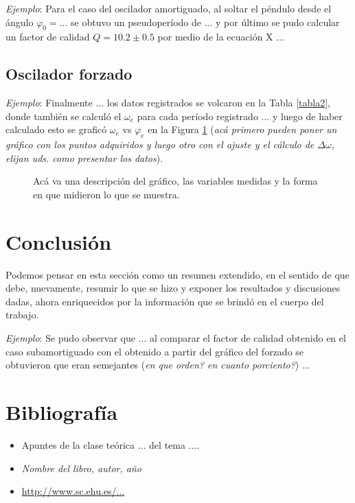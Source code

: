 \documentclass[12pt,a4paper]{article}
\begin{document}
\textit{Ejemplo}: Para el caso del oscilador amortiguado, al soltar el péndulo desde el ángulo $\varphi_0=...$ se obtuvo un pseudoperíodo de ... y por último se pudo calcular un factor de calidad $Q=10.2 \pm 0.5$ por medio de la ecuación X ...

\subsection{Oscilador forzado}

\textit{Ejemplo}: Finalmente ... los datos registrados se volcaron en la Tabla \ref{tabla2}, donde también se calculó el $\omega_e$ para cada período registrado ... y luego de haber calculado esto se graficó $\omega_e$ vs $\varphi_e$ en la Figura \ref{fig2} (\textit{acá primero pueden poner un gráfico con los puntos adquiridos y luego otro con el ajuste y el cálculo de $\Delta \omega$, elijan uds. como presentar los datos}). 




\begin{figure}[ht]
    \centering
    \caption{Acá va una descripción del gráfico, las variables medidas y la forma en que midieron lo que se muestra. }
    \label{fig2}
\end{figure}


\section{Conclusión}

Podemos pensar en esta sección como un resumen extendido, en el sentido de que debe, nuevamente, resumir lo que se hizo y exponer los resultados y discusiones dadas, ahora enriquecidos por la información que se brindó en el cuerpo del trabajo.

\textit{Ejemplo}: Se pudo observar que ... al comparar el factor de calidad obtenido en el caso subamortiguado con el obtenido
a partir del gráfico del forzado se obtuvieron que eran semejantes (\textit{en que orden? en cuanto porciento?}) ...


\section{Bibliografía}
\begin{itemize}
    \item Apuntes de la clase teórica ... del tema ....
    \item \textit{Nombre del libro, autor, año}
    \item \hyperlink{http://www.sc.ehu.es/...}{http://www.sc.ehu.es/...}
\end{itemize}
\end{document}
